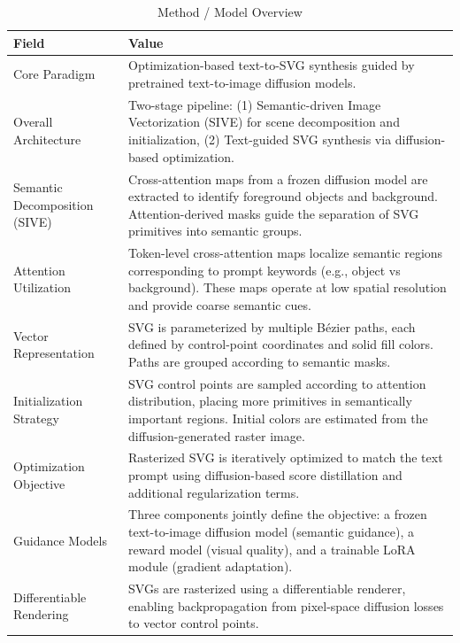 \begin{table}[h!]
\centering
\caption{Method / Model Overview}
\begin{tabular}{|l|p{10cm}|}
\hline
\textbf{Field} & \textbf{Value} \\ \hline

Core Paradigm &
Optimization-based text-to-SVG synthesis guided by pretrained text-to-image diffusion models. \\ \hline

Overall Architecture &
Two-stage pipeline: (1) Semantic-driven Image Vectorization (SIVE) for scene decomposition and initialization, (2) Text-guided SVG synthesis via diffusion-based optimization. \\ \hline

Semantic Decomposition (SIVE) &
Cross-attention maps from a frozen diffusion model are extracted to identify foreground objects and background. Attention-derived masks guide the separation of SVG primitives into semantic groups. \\ \hline

Attention Utilization &
Token-level cross-attention maps localize semantic regions corresponding to prompt keywords (e.g., object vs background). These maps operate at low spatial resolution and provide coarse semantic cues. \\ \hline

Vector Representation &
SVG is parameterized by multiple Bézier paths, each defined by control-point coordinates and solid fill colors. Paths are grouped according to semantic masks. \\ \hline

Initialization Strategy &
SVG control points are sampled according to attention distribution, placing more primitives in semantically important regions. Initial colors are estimated from the diffusion-generated raster image. \\ \hline

Optimization Objective &
Rasterized SVG is iteratively optimized to match the text prompt using diffusion-based score distillation and additional regularization terms. \\ \hline

Guidance Models &
Three components jointly define the objective: a frozen text-to-image diffusion model (semantic guidance), a reward model (visual quality), and a trainable LoRA module (gradient adaptation). \\ \hline

Differentiable Rendering &
SVGs are rasterized using a differentiable renderer, enabling backpropagation from pixel-space diffusion losses to vector control points. \\ \hline

\end{tabular}
\end{table}


